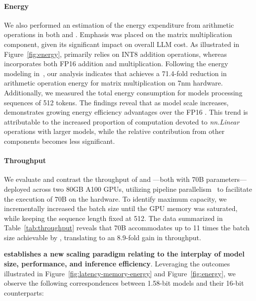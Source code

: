 \paragraph{Energy}

We also performed an estimation of the energy expenditure from arithmetic operations in both  and . Emphasis was placed on the matrix multiplication component, given its significant impact on overall LLM cost. As illustrated in Figure~\ref{fig:energy},  primarily relies on INT8 addition operations, whereas  incorporates both FP16 addition and multiplication. Following the energy modeling in~\cite{energycost, pokebnn}, our analysis indicates that  achieves a 71.4-fold reduction in arithmetic operation energy for matrix multiplication on 7nm hardware. Additionally, we measured the total energy consumption for models processing sequences of 512 tokens. The findings reveal that as model scale increases,  demonstrates growing energy efficiency advantages over the FP16 . This trend is attributable to the increased proportion of computation devoted to \emph{nn.Linear} operations with larger models, while the relative contribution from other components becomes less significant.

\paragraph{Throughput}

We evaluate and contrast the throughput of  and —both with 70B parameters—deployed across two 80GB A100 GPUs, utilizing pipeline parallelism~\cite{gpipe} to facilitate the execution of  70B on the hardware. To identify maximum capacity, we incrementally increased the batch size until the GPU memory was saturated, while keeping the sequence length fixed at 512. The data summarized in Table~\ref{tab:throughput} reveals that  70B accommodates up to 11 times the batch size achievable by , translating to an 8.9-fold gain in throughput.

\textbf{ establishes a new scaling paradigm relating to the interplay of model size, performance, and inference efficiency}. Leveraging the outcomes illustrated in Figure~\ref{fig:latency-memory-energy} and Figure~\ref{fig:energy}, we observe the following correspondences between 1.58-bit models and their 16-bit counterparts:

